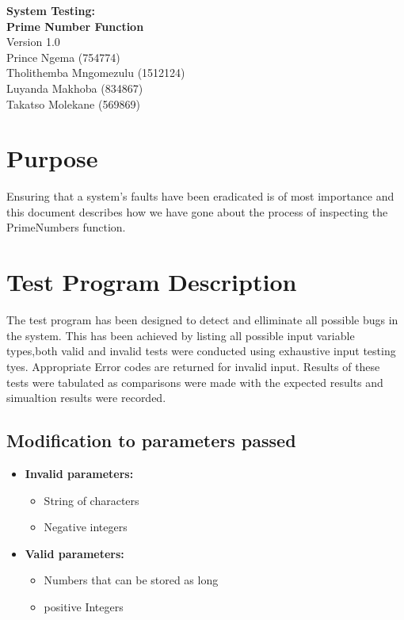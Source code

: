 \documentclass[11 pt]{article}
\begin{document}
  
  \begin{titlepage}
\begin{center}
\huge{\bfseries{System Testing:}}\\
[2mm]
\huge{\bfseries{Prime Number Function}}\\
Version 1.0\\
  \vskip 0.2in
 Prince Ngema (754774)\\
 Tholithemba Mngomezulu (1512124)\\
 Luyanda Makhoba (834867) \\
 Takatso Molekane (569869)\\
 
 

\end{center}
 \end{titlepage}
 \tableofcontents
 \newpage
 \section{Purpose}
Ensuring that a system's faults have been eradicated is of most importance and this document describes how we have gone about the process of inspecting the PrimeNumbers function.
\section{Test Program Description}
The test program has been designed to detect and elliminate all possible bugs in the system. This has been achieved by listing all possible input variable types,both valid and invalid tests were conducted using exhaustive input testing tyes. Appropriate Error codes are returned for invalid input. Results of these tests were tabulated as comparisons were made with the expected results and simualtion results were recorded.\\



\subsection{Modification to parameters passed}
\begin{itemize}
\item
\textbf{Invalid parameters:}
\begin{itemize}
\item
String of characters
\item
Negative integers
\end{itemize}

\item
\textbf{Valid parameters:}
\begin{itemize}
\item
Numbers that can be stored as long
\item
 positive Integers
\end{itemize}
\end{itemize}
\end{document}
